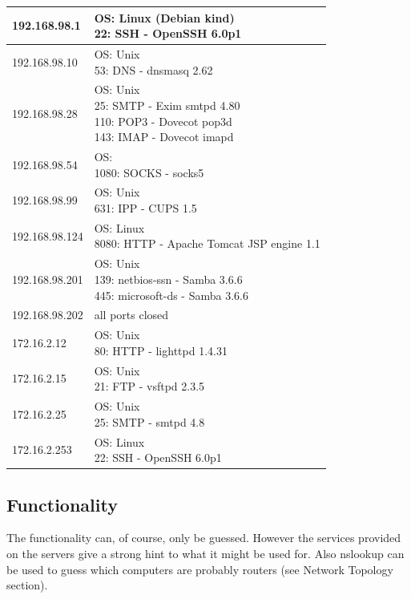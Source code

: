 \documentclass[12pt,a4paper,titlepage,oneside]{scrartcl}
\begin{document}
\renewcommand{\arraystretch}{2.5}
\begin{tabular}{| l | l |}
\hline
192.168.98.1 & \pbox[c]{\textwidth}{OS: Linux (Debian kind) \\ 22: SSH - OpenSSH 6.0p1} \\ \hline
192.168.98.10 & \pbox[c]{\textwidth}{OS: Unix  \\ 53: DNS - dnsmasq 2.62} \\ \hline
192.168.98.28 & \pbox[c]{\textwidth}{OS: Unix  \\ 25: SMTP - Exim smtpd 4.80 \\ 110: POP3 - Dovecot pop3d \\ 143: IMAP - Dovecot imapd} \\ \hline
192.168.98.54 & \pbox[c]{\textwidth}{ OS:  \\ 1080: SOCKS - socks5}  \\ \hline
192.168.98.99 & \pbox[c]{\textwidth}{OS: Unix  \\ 631: IPP - CUPS 1.5}  \\ \hline
192.168.98.124 & \pbox[c]{\textwidth}{OS: Linux \\ 8080: HTTP - Apache Tomcat JSP engine 1.1}  \\ \hline
192.168.98.201 & \pbox[c]{\textwidth}{OS: Unix \\ 139: netbios-ssn - Samba 3.6.6 \\ 445: microsoft-ds - Samba 3.6.6}  \\ \hline
192.168.98.202 & all ports closed  \\ \hline
172.16.2.12 & \pbox[c]{\textwidth}{OS: Unix  \\ 80: HTTP - lighttpd 1.4.31}  \\ \hline
172.16.2.15 & \pbox[c]{\textwidth}{OS: Unix \\ 21: FTP - vsftpd 2.3.5}  \\ \hline
172.16.2.25 & \pbox[c]{\textwidth}{OS: Unix \\ 25: SMTP - smtpd 4.8}  \\ \hline
172.16.2.253 & \pbox[c]{\textwidth}{OS: Linux \\ 22: SSH - OpenSSH 6.0p1}  \\ \hline
\end{tabular}

\subsection{Functionality}
The functionality can, of course, only be guessed. However the services provided on the servers give a strong hint to what it might be used for. Also nslookup can be used to guess which computers are probably routers (see Network Topology section).
 
\end{document}
